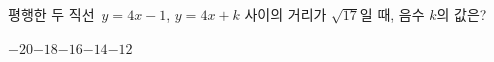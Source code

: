 평행한 두 직선~$y=4x-1$, $y=4x+k$ 사이의 거리가 $\sqrt{17}$일 때, 음수 $k$의 값은?
\begin{choices32}{$-20$}{$-18$}{$-16$}{$-14$}{$-12$}\end{choices32}
